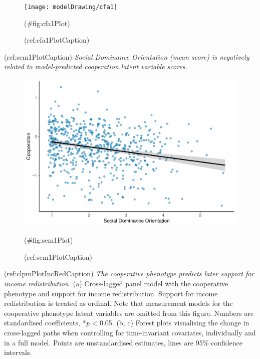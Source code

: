 \begin{appendix}
\begin{figure}
\texttt{[image: modelDrawing/cfa1]} \caption{(ref:cfa1PlotCaption)}(\#fig:cfa1Plot)
\end{figure}

\newpage

(ref:sem1PlotCaption) \emph{Social Dominance Orientation (mean score) is
negatively related to model-predicted cooperation latent variable
scores.}

\begin{figure}
\includegraphics[width=0.8\linewidth]{manuscript_files/figure-latex/sem1Plot-1} \caption{(ref:sem1PlotCaption)}(\#fig:sem1Plot)
\end{figure}

\newpage

(ref:clpmPlotIncRedCaption) \emph{The cooperative phenotype predicts
later support for income redistribution.} (a) Cross-lagged panel model
with the cooperative phenotype and support for income redistribution.
Support for income redistribution is treated as ordinal. Note that
measurement models for the cooperative phenotype latent variables are
omitted from this figure. Numbers are standardised coefficients,
*\emph{p} \textless{} 0.05. (b, c) Forest plots visualising the change
in cross-lagged paths when controlling for time-invariant covariates,
individually and in a full model. Points are unstandardised estimates,
lines are 95\% confidence intervals.


\end{appendix}
